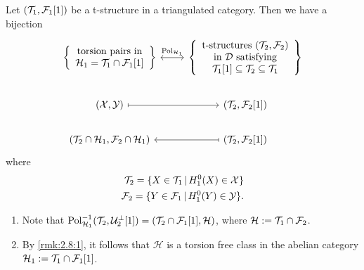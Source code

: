 \begin{prop}\label{prop:2.7}
  Let $(\mathcal{T}_1,\mathcal{F}_1[1])$ be a t-structure in a triangulated category.
  Then we have a bijection
  \begin{equation*}
    \begin{tikzcd}
      \left\{
      \begin{array}{c}
        \text{torsion pairs in} \\
        \mathcal{H}_1=\T_1\cap \F_1[1]
      \end{array}
      \right\}
      \arrow[leftrightarrow]{r}{\mathrm{Pol}_{\mathcal{H}_1}}
        &
        \left\{
          \begin{array}{c}
            \text{t-structures }
            (\T_2,\F_2) \\
            \text{ in } \mathcal{D}
            \text{ satisfying } \\ \T_1[1]\subseteq \T_2\subseteq\T_1
          \end{array}
        \right\}\\
      (\mathcal{X},\mathcal{Y})\arrow[mapsto]{r}
        & (\T_2,\F_2[1])\\
      (\T_2\cap\mathcal{H}_1,\F_2\cap\mathcal{H}_1)\arrow[mapsfrom]{r}
        & (\T_2,\F_2[1])
    \end{tikzcd}
  \end{equation*}
  where
  \begin{align*}
    \mathcal{T}_2 = \{X\in\mathcal{T}_1\,|\,H^0_1(X)\in\mathcal{X}\}\\
    \mathcal{F}_2 = \{Y\in\mathcal{F}_1\,|\,H^0_1(Y)\in\mathcal{Y}\}.
  \end{align*}
\end{prop}

\begin{rmk}\label{rmk:2.8}
  \begin{enumerate}[label=(\arabic*)]
    \item\label{rmk:2.8:1} Note that $\mathrm{Pol}^{-1}_{\mathcal{H}_1}(\mathcal{T}_2,\mathcal{U}^\perp_2[1])=
      (\mathcal{T}_2\cap\mathcal{F}_1[1],\mathcal{H})$, where
      $\mathcal{H}:=\mathcal{T}_1\cap\mathcal{F}_2$.

    \item By \ref{rmk:2.8:1}, it follows that $\mathcal{H}$ is a torsion free class in the abelian category
      $\mathcal{H}_1:=\mathcal{T}_1\cap\mathcal{F}_1[1]$.
  \end{enumerate}
\end{rmk}

